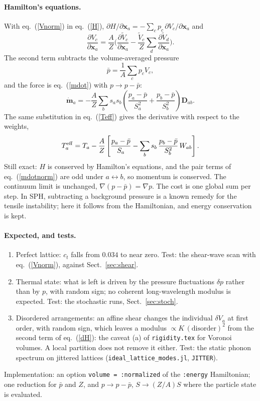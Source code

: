 \documentclass[11pt,aps,preprint,nofootinbib,superscriptaddress,tightenlines]{revtex4-2}
\def\st{\begin{equation}}
\def\stp{\end{equation}}
\def\Eq#1{eq.~(\ref{#1})}
\def\Sect#1{Sect.~\ref{#1}}
\let\oldparagraph\paragraph
\renewcommand{\paragraph}{\par\bigskip\oldparagraph}
\begin{document}
\paragraph{Hamilton's equations.}  With \Eq{Vnorm} in \Eq{H},
$\partial H/\partial\bm x_a=-\sum_cp_c\,\partial V_c/\partial\bm x_a$ and
\st
\frac{\partial V_c}{\partial\bm x_a}=\frac AZ\Big(\frac{\partial\tilde V_c}{\partial\bm x_a}
-\frac{\tilde V_c}{Z}\sum_d\frac{\partial\tilde V_d}{\partial\bm x_a}\Big).
\stp
The second term subtracts the volume-averaged pressure
\st
\bar p=\frac1A\sum_cp_cV_c ,
\stp
and the force is \Eq{mdot} with $p\to p-\bar p$:
\st
\dot{\bm m}_a=-\frac AZ\sum_bs_as_b\left(\frac{p_a-\bar p}{S_a^2}+\frac{p_b-\bar p}{S_b^2}\right)\bm D_{ab}.
\label{mdotnorm}
\stp
The same substitution in \Eq{Teff} gives the derivative with respect to the weights,
\st
T^{\rm eff}_a=T_a-\frac AZ\left[\frac{p_a-\bar p}{S_a}-\sum_bs_b\,\frac{p_b-\bar p}{S_b^2}\,W_{ab}\right].
\stp
Still exact: $H$ is conserved by Hamilton's equations, and the pair terms of
\Eq{mdotnorm} are odd under $a\leftrightarrow b$, so momentum is conserved.  The continuum
limit is unchanged, $\nabla(p-\bar p)=\nabla p$.  The cost is one global sum per step.
In SPH, subtracting a background pressure is a known remedy for the tensile
instability; here it follows from the Hamiltonian, and energy conservation is kept.

\paragraph{Expected, and tests.}
\begin{enumerate}
\item Perfect lattice: $c_t$ falls from $0.034$ to near zero.  Test: the shear-wave scan
  with \Eq{Vnorm}, against \Sect{sec:shear}.
\item Thermal state: what is left is driven by the pressure fluctuations $\delta p$
  rather than by $p$, with random sign; no coherent long-wavelength modulus is expected.
  Test: the stochastic runs, \Sect{sec:stoch}.
\item Disordered arrangements: an affine shear changes the individual $\delta V_a$ at first
  order, with random sign, which leaves a modulus $\propto K\,(\text{disorder})^2$ from the
  second term of \Eq{dH}: the caveat (a) of \texttt{rigidity.tex} for Voronoi volumes.  A
  local partition does not remove it either.  Test: the static phonon spectrum on jittered
  lattices (\texttt{ideal\_lattice\_modes.jl}, \texttt{JITTER}).
\end{enumerate}
Implementation: an option \texttt{volume = :normalized} of the \texttt{:energy}
Hamiltonian; one reduction for $\bar p$ and $Z$, and $p\to p-\bar p$, $S\to(Z/A)S$ where
the particle state is evaluated.
\end{document}
